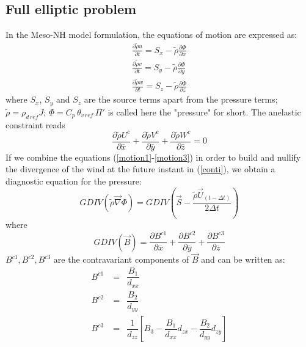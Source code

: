 \subsection{Full elliptic problem}
\par In the  Meso-NH model formulation, the equations of motion are
expressed as:
\begin{eqnarray}
\label{motion1}
\frac {\partial{\tilde{\rho} { u }} } {\partial{t} } = S_x - \tilde{\rho}
\frac{\partial{\Phi} }{\partial{x} } \\
\label{motion2}
\frac {\partial{\tilde{\rho} { v }} } {\partial{t} } = S_y - \tilde{\rho}
\frac{\partial{\Phi} }{\partial y} \\
\label{motion3}
\frac {\partial{\tilde{\rho} {w}} } {\partial{t} } = S_z - \tilde{\rho}
\frac{\partial{\Phi} }{\partial z}
\end{eqnarray}
where $S_x$, $S_y$ and $S_z$ are the source terms apart from the
pressure terms; $\tilde{\rho} = \rho_{d\,ref} J$; $\Phi = C_p \,
\theta_{v\,ref}\,\Pi '$ is called here the "pressure" for short.
The anelastic constraint reads\\
\begin{equation}
\label{conti}
     \dfrac {\partial{\tilde{\rho} U^{c} } } {\partial{\overline{x} } }
   + \dfrac {\partial{\tilde{\rho} V^{c} } } {\partial{\overline{y} } }
   + \dfrac {\partial{\tilde{\rho} W^{c} } } {\partial{\overline{z} } } = 0
\end{equation}
If we combine the equations (\ref{motion1}-\ref{motion3}) in order to build and
nullify the divergence of the wind at the future instant in (\ref{conti}), we
obtain a diagnostic equation for the pressure:
\begin{equation}
\label{conteq}
GDIV(\tilde{\rho}  \overrightarrow{\nabla} \Phi) = GDIV \left(
\overrightarrow {S} -
\dfrac{\tilde{\rho} \vec{U}_{(t-\Delta t)} }
{2 \Delta t}
\right)
\end{equation}
where
\begin{displaymath}
GDIV(\vec{B}) = \dfrac {\partial{ B^{c1} } } {\partial{\overline{x} } }
               + \dfrac {\partial{ B^{c2} } } {\partial{\overline{y} } }
               + \dfrac {\partial{ B^{c3} } } {\partial{\overline{z} } }
\end{displaymath}
$B^{c1}, B^{c2}, B^{c3}$ are the contravariant components of
$\overrightarrow{B}$ and can be written as:
\begin{eqnarray}
 B^{c1} \;  &  = &
 \dfrac{{B_1}}{ d_{xx}} \\
 B^{c2} \;  &  = &
 \dfrac{{B_2}}{ d_{yy}} \\
 B^{c3} \;  & = &
\dfrac{1}{d_{zz}}
\left[  B_3 -
   \dfrac  {B_1} {d_{xx}}  d_{zx}
-  \dfrac  {B_2} {d_{yy}}  d_{zy}  \right]
\end{eqnarray}

